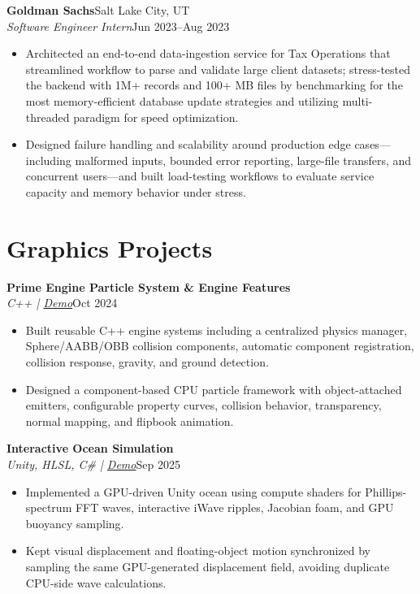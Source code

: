 \documentclass[10pt,letterpaper]{article}
\newcommand{\resumeEntry}[4]{
  \textbf{#1}\hfill #2\\
  \textit{#3}\hfill #4\\[-10pt]
}
\begin{document}
\resumeEntry{Goldman Sachs}{Salt Lake City, UT}{Software Engineer Intern}{Jun 2023--Aug 2023}
\begin{itemize}
    \item Architected an end-to-end data-ingestion service for Tax Operations that streamlined workflow to parse and validate large client datasets; stress-tested the backend with 1M+ records and 100+ MB files by benchmarking for the most memory-efficient database update strategies and utilizing multi-threaded paradigm for speed optimization.
    \item Designed failure handling and scalability around production edge cases—including malformed inputs, bounded error reporting, large-file transfers, and concurrent users—and built load-testing workflows to evaluate service capacity and memory behavior under stress.
\end{itemize}

\section{Graphics Projects}

\resumeEntry{Prime Engine Particle System \& Engine Features}{}{C++ \;|\; \href{https://www.phuongp.com/2024/10/01/particle-system/}{Demo}}{Oct 2024}
\begin{itemize}
    \item Built reusable C++ engine systems including a centralized physics manager, Sphere/AABB/OBB collision components, automatic component registration, collision response, gravity, and ground detection.
    \item Designed a component-based CPU particle framework with object-attached emitters, configurable property curves, collision behavior, transparency, normal mapping, and flipbook animation.
\end{itemize}

\resumeEntry{Interactive Ocean Simulation}{}{Unity, HLSL, C\# \;|\; \href{https://www.phuongp.com/highlights/2025/09/10/ocean-simulation/}{Demo}}{Sep 2025}
\begin{itemize}
    \item Implemented a GPU-driven Unity ocean using compute shaders for Phillips-spectrum FFT waves, interactive iWave ripples, Jacobian foam, and GPU buoyancy sampling.
    \item Kept visual displacement and floating-object motion synchronized by sampling the same GPU-generated displacement field, avoiding duplicate CPU-side wave calculations.
\end{itemize}
\end{document}
